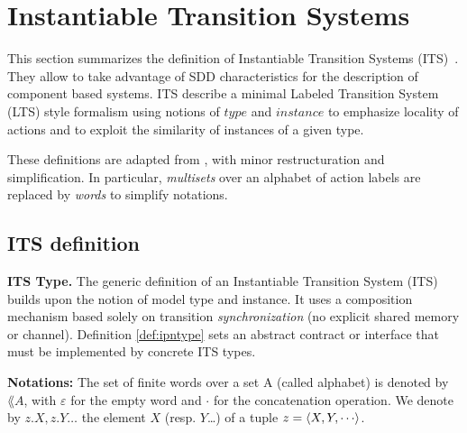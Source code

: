 \section{Instantiable Transition Systems}


This section summarizes the definition of Instantiable Transition Systems
(ITS)~\cite{tacas09tmphk}. They allow to take advantage of SDD characteristics
for the description of component based systems. ITS describe a minimal Labeled
Transition System (LTS) style formalism using notions of $type$ and $instance$
to emphasize locality of actions and to exploit the similarity of instances of
a given type.

These definitions are adapted from \cite{tacas09tmphk}, with minor
restructuration and simplification. In particular, \emph{multisets} over an
alphabet of action labels are replaced by \emph{words} to simplify notations.

\subsection{ITS definition}

\textbf{ITS Type.}
The generic definition of an Instantiable Transition System (ITS) builds upon
the notion of model type and instance. It uses a composition mechanism based
solely on transition \emph{synchronization} (no explicit shared memory or
channel). Definition \ref{def:ipntype} sets an abstract contract or interface
that must be implemented by concrete ITS types.

\textbf{Notations:} The set of finite words over a set A (called
alphabet) is denoted by $\lang{A}$, with $\varepsilon$ for the empty
word and $\cdot$ for the concatenation operation.  We denote by $z.X,
z.Y \ldots$ the element $X$ (resp. $Y$\ldots) of a tuple $z =
\langle {X,Y,\cdots} \rangle$.

